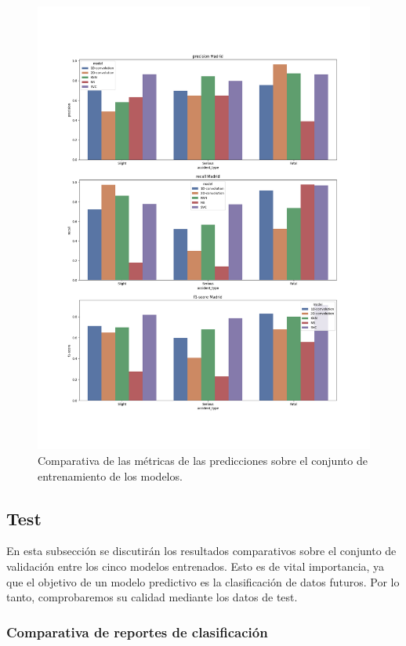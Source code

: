   \begin{figure}[H]
      \centering
      \includegraphics[width=13cm]{archivos/5.Resultados/ComparativaTrain}
      \caption{Comparativa de las métricas de las predicciones sobre el conjunto de entrenamiento de los modelos.}
      \label{ResultsTrainImage}
   \end{figure}



\subsection{Test}

  En esta subsección se discutirán los resultados comparativos sobre el conjunto de validación entre los cinco modelos entrenados. Esto es de vital importancia, ya que el objetivo de un modelo predictivo es la clasificación de datos futuros. Por lo tanto, comprobaremos su calidad mediante los datos de test.

  \subsubsection{Comparativa de reportes de clasificación}

